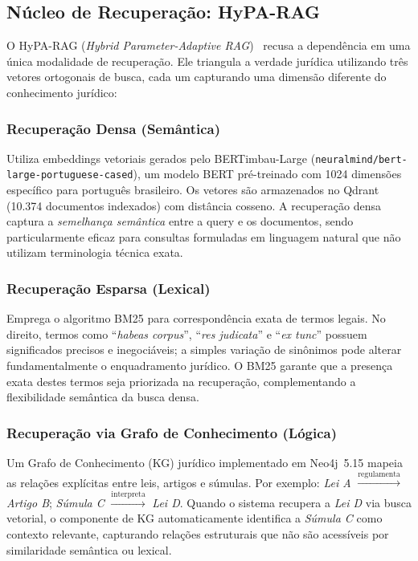 \documentclass[journal,10pt]{IEEEtran}
\begin{document}
\subsection{N\'{u}cleo de Recupera\c{c}\~{a}o: HyPA-RAG}

O HyPA-RAG (\textit{Hybrid Parameter-Adaptive RAG})~\cite{hyparag2024a} recusa a depend\^{e}ncia em uma \'{u}nica modalidade de recupera\c{c}\~{a}o. Ele triangula a verdade jur\'{i}dica utilizando tr\^{e}s vetores ortogonais de busca, cada um capturando uma dimens\~{a}o diferente do conhecimento jur\'{i}dico:

\subsubsection{Recupera\c{c}\~{a}o Densa (Sem\^{a}ntica)}
Utiliza embeddings vetoriais gerados pelo BERTimbau-Large (\texttt{neuralmind/bert-large-portuguese-cased}), um modelo BERT pr\'{e}-treinado com 1024 dimens\~{o}es espec\'{i}fico para portugu\^{e}s brasileiro. Os vetores s\~{a}o armazenados no Qdrant (10.374 documentos indexados) com dist\^{a}ncia cosseno. A recupera\c{c}\~{a}o densa captura a \textit{semelhan\c{c}a sem\^{a}ntica} entre a query e os documentos, sendo particularmente eficaz para consultas formuladas em linguagem natural que n\~{a}o utilizam terminologia t\'{e}cnica exata.

\subsubsection{Recupera\c{c}\~{a}o Esparsa (Lexical)}
Emprega o algoritmo BM25 para correspond\^{e}ncia exata de termos legais. No direito, termos como ``\textit{habeas corpus}'', ``\textit{res judicata}'' e ``\textit{ex tunc}'' possuem significados precisos e inegoci\'{a}veis; a simples varia\c{c}\~{a}o de sin\^{o}nimos pode alterar fundamentalmente o enquadramento jur\'{i}dico. O BM25 garante que a presen\c{c}a exata destes termos seja priorizada na recupera\c{c}\~{a}o, complementando a flexibilidade sem\^{a}ntica da busca densa.

\subsubsection{Recupera\c{c}\~{a}o via Grafo de Conhecimento (L\'{o}gica)}
Um Grafo de Conhecimento (KG) jur\'{i}dico implementado em Neo4j~5.15 mapeia as rela\c{c}\~{o}es expl\'{i}citas entre leis, artigos e s\'{u}mulas. Por exemplo: \textit{Lei A} $\xrightarrow{\text{regulamenta}}$ \textit{Artigo B}; \textit{S\'{u}mula C} $\xrightarrow{\text{interpreta}}$ \textit{Lei D}. Quando o sistema recupera a \textit{Lei D} via busca vetorial, o componente de KG automaticamente identifica a \textit{S\'{u}mula C} como contexto relevante, capturando rela\c{c}\~{o}es estruturais que n\~{a}o s\~{a}o acess\'{i}veis por similaridade sem\^{a}ntica ou lexical.
\end{document}
